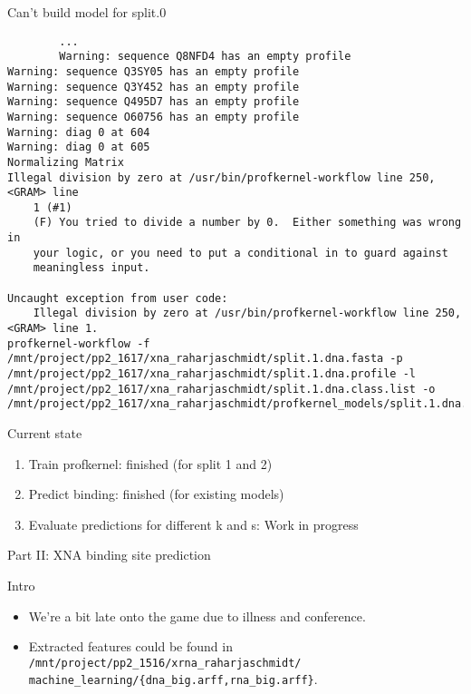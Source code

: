 \documentclass[pdf]
{beamer}
\begin{document}
\begin{frame}[fragile]
	\begin{center}
	\large Can't build model for split.0
	\begin{tiny}
		\begin{verbatim}
		...
		Warning: sequence Q8NFD4 has an empty profile
Warning: sequence Q3SY05 has an empty profile
Warning: sequence Q3Y452 has an empty profile
Warning: sequence Q495D7 has an empty profile
Warning: sequence O60756 has an empty profile
Warning: diag 0 at 604 
Warning: diag 0 at 605 
Normalizing Matrix
Illegal division by zero at /usr/bin/profkernel-workflow line 250, <GRAM> line
	1 (#1)
    (F) You tried to divide a number by 0.  Either something was wrong in
    your logic, or you need to put a conditional in to guard against
    meaningless input.
    
Uncaught exception from user code:
	Illegal division by zero at /usr/bin/profkernel-workflow line 250, <GRAM> line 1.
profkernel-workflow -f /mnt/project/pp2_1617/xna_raharjaschmidt/split.1.dna.fasta -p /mnt/project/pp2_1617/xna_raharjaschmidt/split.1.dna.profile -l /mnt/project/pp2_1617/xna_raharjaschmidt/split.1.dna.class.list -o /mnt/project/pp2_1617/xna_raharjaschmidt/profkernel_models/split.1.dna.k2s3

		\end{verbatim}
		\end{tiny}
	\end{center}
\end{frame}

\begin{frame}{Current state}
	\begin{center}
	\begin{enumerate}
	\item Train profkernel: finished (for split 1 and 2)
	\item Predict binding: finished (for existing models)
	\item Evaluate predictions for different k and s: Work in progress
	\end{enumerate}
	\end{center}
\end{frame}

\begin{frame}
	\begin{center}
		\Large Part II: XNA binding site prediction
	\end{center}
\end{frame}

\begin{frame}{Intro}
	\begin{itemize}
		\item We're a bit late onto the game due to illness and conference.
		\item Extracted features could be found in \texttt{/mnt/project/pp2\_1516/xrna\_raharjaschmidt/} \texttt{machine\_learning/\{dna\_big.arff,rna\_big.arff\}}.
	\end{itemize}
\end{frame}
\end{document}
